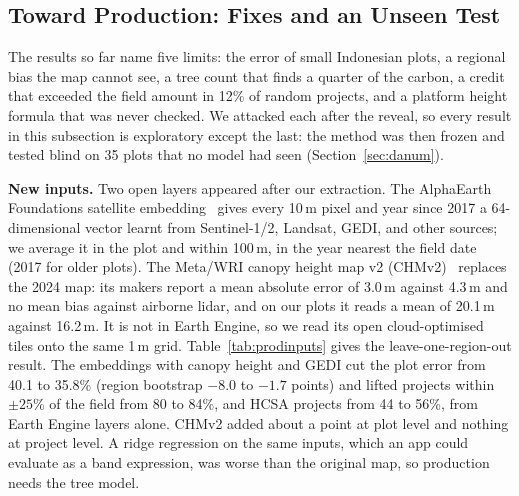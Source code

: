 \documentclass[conference,a4paper]{IEEEtran}
\begin{document}
\subsection{Toward Production: Fixes and an Unseen Test}
\label{sec:production}
The results so far name five limits: the error of small Indonesian plots, a regional bias the map cannot see, a tree count that finds a quarter of the carbon, a credit that exceeded the field amount in 12\% of random projects, and a platform height formula that was never checked. We attacked each after the reveal, so every result in this subsection is exploratory except the last: the method was then frozen and tested blind on 35 plots that no model had seen (Section~\ref{sec:danum}).

\textbf{New inputs.} Two open layers appeared after our extraction. The AlphaEarth Foundations satellite embedding~\cite{brown2025alphaearth} gives every 10\,m pixel and year since 2017 a 64-dimensional vector learnt from Sentinel-1/2, Landsat, GEDI, and other sources; we average it in the plot and within 100\,m, in the year nearest the field date (2017 for older plots). The Meta/WRI canopy height map v2 (CHMv2)~\cite{brandt2026chmv2} replaces the 2024 map: its makers report a mean absolute error of 3.0\,m against 4.3\,m and no mean bias against airborne lidar, and on our plots it reads a mean of 20.1\,m against 16.2\,m. It is not in Earth Engine, so we read its open cloud-optimised tiles onto the same 1\,m grid. Table~\ref{tab:prodinputs} gives the leave-one-region-out result. The embeddings with canopy height and GEDI cut the plot error from 40.1 to 35.8\% (region bootstrap $-8.0$ to $-1.7$ points) and lifted projects within $\pm25$\% of the field from 80 to 84\%, and HCSA projects from 44 to 56\%, from Earth Engine layers alone. CHMv2 added about a point at plot level and nothing at project level. A ridge regression on the same inputs, which an app could evaluate as a band expression, was worse than the original map, so production needs the tree model.
\end{document}

